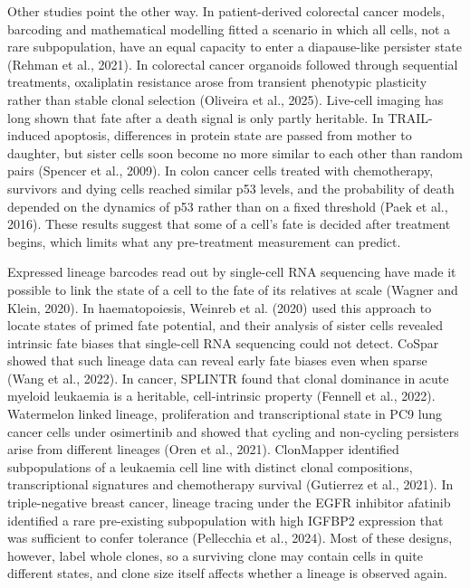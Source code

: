\documentclass[11pt,a4paper]{article}
\begin{document}
Other studies point the other way. In patient-derived colorectal cancer models, barcoding and mathematical modelling fitted a scenario in which all cells, not a rare subpopulation, have an equal capacity to enter a diapause-like persister state (Rehman et al., 2021). In colorectal cancer organoids followed through sequential treatments, oxaliplatin resistance arose from transient phenotypic plasticity rather than stable clonal selection (Oliveira et al., 2025). Live-cell imaging has long shown that fate after a death signal is only partly heritable. In TRAIL-induced apoptosis, differences in protein state are passed from mother to daughter, but sister cells soon become no more similar to each other than random pairs (Spencer et al., 2009). In colon cancer cells treated with chemotherapy, survivors and dying cells reached similar p53 levels, and the probability of death depended on the dynamics of p53 rather than on a fixed threshold (Paek et al., 2016). These results suggest that some of a cell's fate is decided after treatment begins, which limits what any pre-treatment measurement can predict.

Expressed lineage barcodes read out by single-cell RNA sequencing have made it possible to link the state of a cell to the fate of its relatives at scale (Wagner and Klein, 2020). In haematopoiesis, Weinreb et al. (2020) used this approach to locate states of primed fate potential, and their analysis of sister cells revealed intrinsic fate biases that single-cell RNA sequencing could not detect. CoSpar showed that such lineage data can reveal early fate biases even when sparse (Wang et al., 2022). In cancer, SPLINTR found that clonal dominance in acute myeloid leukaemia is a heritable, cell-intrinsic property (Fennell et al., 2022). Watermelon linked lineage, proliferation and transcriptional state in PC9 lung cancer cells under osimertinib and showed that cycling and non-cycling persisters arise from different lineages (Oren et al., 2021). ClonMapper identified subpopulations of a leukaemia cell line with distinct clonal compositions, transcriptional signatures and chemotherapy survival (Gutierrez et al., 2021). In triple-negative breast cancer, lineage tracing under the EGFR inhibitor afatinib identified a rare pre-existing subpopulation with high IGFBP2 expression that was sufficient to confer tolerance (Pellecchia et al., 2024). Most of these designs, however, label whole clones, so a surviving clone may contain cells in quite different states, and clone size itself affects whether a lineage is observed again.
\end{document}
